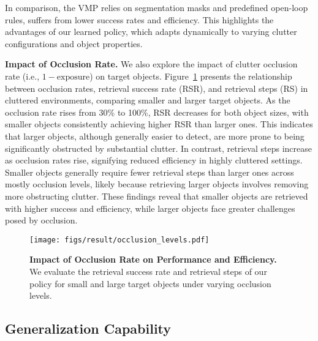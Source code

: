 \documentclass[10pt, a4paper, logo, twocolumn, copyright]{psibot} %
\begin{document}
In comparison, the VMP relies on segmentation masks and predefined open-loop rules, suffers from lower success rates and efficiency. This highlights the advantages of our learned policy, which adapts dynamically to varying clutter configurations and object properties.


\noindent \textbf{Impact of Occlusion Rate.} 
We also explore the impact of clutter occlusion rate (i.e., $1-\textrm{exposure}$) on target objects. Figure~\ref{fig:occlusion} presents the relationship between occlusion rates, retrieval success rate (RSR), and retrieval steps (RS) in cluttered environments, comparing smaller and larger target objects. As the occlusion rate rises from 30\% to 100\%, RSR decreases for both object sizes, with smaller objects consistently achieving higher RSR than larger ones. This indicates that larger objects, although generally easier to detect, are more prone to being significantly obstructed by substantial clutter. In contrast, retrieval steps increase as occlusion rates rise, signifying reduced efficiency in highly cluttered settings. Smaller objects generally require fewer retrieval steps than larger ones across mostly occlusion levels, likely because retrieving larger objects involves removing more obstructing clutter. These findings reveal that smaller objects are retrieved with higher success and efficiency, while larger objects face greater challenges posed by occlusion.

\begin{figure}[!h]
    \centering
    \texttt{[image: figs/result/occlusion\_levels.pdf]}
    \caption{\textbf{Impact of Occlusion Rate on Performance and Efficiency.} We evaluate the retrieval success rate and retrieval steps of our policy for small and large target objects under varying occlusion levels.}
    \label{fig:occlusion}
\end{figure}

\subsection{Generalization Capability}
\end{document}
